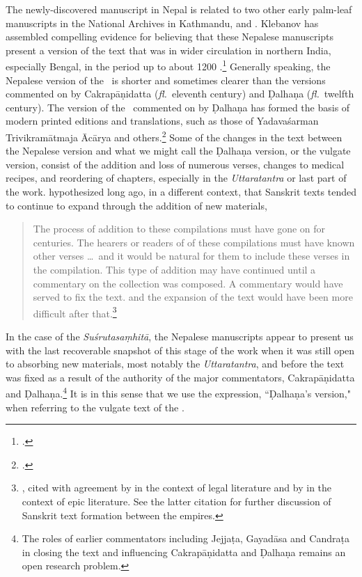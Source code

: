 The newly-discovered manuscript in Nepal is related to two other early palm-leaf
manuscripts in the National Archives in Kathmandu, 
and . Klebanov has assembled compelling evidence for
believing that these Nepalese manuscripts present a version of the text that was
in wider circulation in northern India, especially Bengal, in the period up to
about 1200 \CE.\footcite{kleb-2010,kleb-2021b} Generally speaking, the Nepalese
version of the \SS\ is shorter and sometimes clearer than the versions commented
on by Cakrapāṇidatta (\emph{fl.}\ eleventh century) and Ḍalhaṇa (\emph{fl.}\
twelfth century).  The version of the \SS\ commented on by Ḍalhaṇa has formed the
basis of modern printed editions and translations, such as those of Yadavaśarman
Trivikramātmaja Ācārya and others.\footcite{susr-trikamji1,vulgate,shar-susr} 
Some of the changes in the text between the Nepalese version and what we might
call the Ḍalhaṇa version, or the vulgate version, consist of the addition and loss
of numerous verses, changes to medical recipes, and reordering of chapters,
especially in the \emph{Uttaratantra} or last part of the work. 
\citeauthor{lari-2003} hypothesized long ago, in a different context, that
Sanskrit texts tended to continue to expand through the addition of new materials,
\begin{quote}
The process of addition to these compilations must have gone on for centuries. The
hearers or readers of of these compilations must have known other verses \ldots\
and it would be natural for them to include these verses in the compilation. This
type of  addition may have continued until a commentary on the collection was
composed.   A commentary would have served to fix the text. and the expansion of
the text would have been more difficult after
that.\footnote{\cite[xii]{lari-2003}, cited with agreement by
    \citet[51]{oliv-manu} in the context of legal literature and by
    \citet[62--63]{bron-how} in the context of epic literature.  See the latter
    citation for further discussion of Sanskrit text formation between the empires. 
    }
\end{quote}
In the case of the \emph{Suśrutasaṃhitā}, the Nepalese manuscripts appear to present us 
with the last recoverable snapshot of this stage of the work when it was still open to 
absorbing new materials, most notably the \emph{Uttaratantra}, and before the text was 
fixed as a result of the authority of the major commentators, Cakrapāṇidatta and 
Ḍalhaṇa.\footnote{The roles of earlier commentators including Jejjaṭa, Gayadāsa and 
Candraṭa in closing the text and influencing Cakrapāṇidatta and Ḍalhaṇa remains an open 
research problem.}  It is in this sense that we use the expression, ``Ḍalhaṇa's version," when 
referring to the vulgate text of the \SS.

